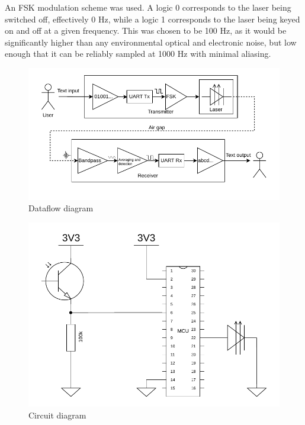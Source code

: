 \documentclass{article}
\begin{document}
\begin{multicols}{2}
An FSK modulation scheme was used. A logic 0 corresponds to the laser being switched off, effectively 0 Hz, while a logic 1 corresponds to the laser being keyed on and off at a given frequency. This was chosen to be 100 Hz, as it would be significantly higher than any environmental optical and electronic noise, but low enough that it can be reliably sampled at 1000 Hz with minimal aliasing.

\begin{figure}[H]
    \includegraphics[width=\linewidth]{figures/dataflow.pdf}
    \caption{Dataflow diagram}
    \label{fig:dataflow}
\end{figure}

\begin{figure}[H]
    \includegraphics[width=\linewidth]{figures/circuit.pdf}
    \caption{Circuit diagram}
    \label{fig:circuit}
\end{figure}


\end{multicols}
\end{document}
